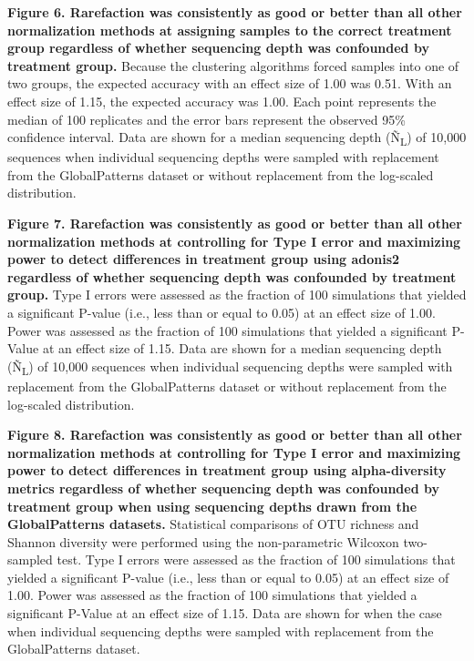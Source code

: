 \documentclass[
]{article}
\begin{document}
\textbf{Figure 6. Rarefaction was consistently as good or better than
all other normalization methods at assigning samples to the correct
treatment group regardless of whether sequencing depth was confounded by
treatment group.} Because the clustering algorithms forced samples into
one of two groups, the expected accuracy with an effect size of 1.00 was
0.51. With an effect size of 1.15, the expected accuracy was 1.00. Each
point represents the median of 100 replicates and the error bars
represent the observed 95\% confidence interval. Data are shown for a
median sequencing depth (Ñ\textsubscript{L}) of 10,000 sequences when
individual sequencing depths were sampled with replacement from the
GlobalPatterns dataset or without replacement from the log-scaled
distribution.

\textbf{Figure 7. Rarefaction was consistently as good or better than
all other normalization methods at controlling for Type I error and
maximizing power to detect differences in treatment group using adonis2
regardless of whether sequencing depth was confounded by treatment
group.} Type I errors were assessed as the fraction of 100 simulations
that yielded a significant P-value (i.e., less than or equal to 0.05) at
an effect size of 1.00. Power was assessed as the fraction of 100
simulations that yielded a significant P-Value at an effect size of
1.15. Data are shown for a median sequencing depth (Ñ\textsubscript{L})
of 10,000 sequences when individual sequencing depths were sampled with
replacement from the GlobalPatterns dataset or without replacement from
the log-scaled distribution.

\textbf{Figure 8. Rarefaction was consistently as good or better than
all other normalization methods at controlling for Type I error and
maximizing power to detect differences in treatment group using
alpha-diversity metrics regardless of whether sequencing depth was
confounded by treatment group when using sequencing depths drawn from
the GlobalPatterns datasets.} Statistical comparisons of OTU richness
and Shannon diversity were performed using the non-parametric Wilcoxon
two-sampled test. Type I errors were assessed as the fraction of 100
simulations that yielded a significant P-value (i.e., less than or equal
to 0.05) at an effect size of 1.00. Power was assessed as the fraction
of 100 simulations that yielded a significant P-Value at an effect size
of 1.15. Data are shown for when the case when individual sequencing
depths were sampled with replacement from the GlobalPatterns dataset.
\end{document}
